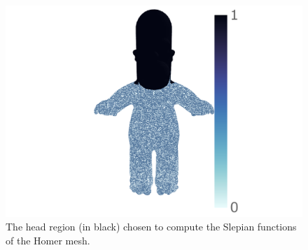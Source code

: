 \begin{figure}[htp]
	\centering
	\includegraphics[trim={156 8 21 6},clip,width=.6\textwidth]{homer_region_norm.pdf}
	\caption{
		The head region (in black) chosen to compute the Slepian functions of the Homer mesh.
	}\label{fig:chapter4_homer_region}
\end{figure}
